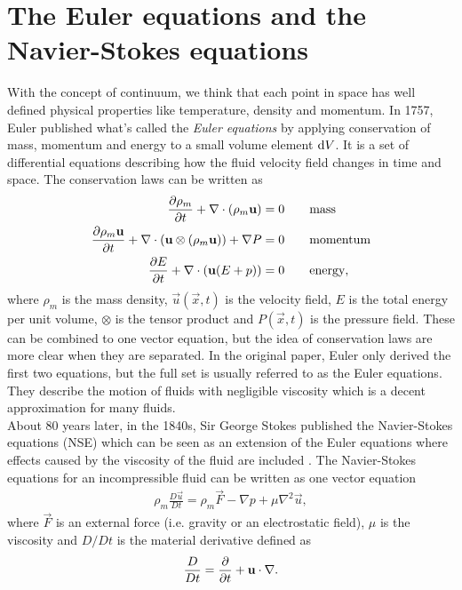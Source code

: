 \section{The Euler equations and the Navier-Stokes equations}
\label{sec:theory_of_fluids_euler_navier}
With the concept of continuum, we think that each point in space has well defined physical properties like temperature, density and momentum. In 1757, Euler published what's called the \textit{Euler equations} by applying conservation of mass, momentum and energy to a small volume element $\mathrm{d}V$. It is a set of differential equations describing how the fluid velocity field changes in time and space. The conservation laws can be written as
\begin{align}
	\frac{\partial \rho_m}{\partial t} + \nabla\cdot (\rho_m\mathbf u) &= 0 \qquad \text{mass}\\
	\frac{\partial \rho_m \mathbf u}{\partial t} + \nabla \cdot (\mathbf u \otimes (\rho_m\mathbf u)) + \nabla P &= 0\qquad \text{momentum}\\
	\frac{\partial E}{\partial t} + \nabla\cdot (\mathbf u(E + p)) &= 0\qquad \text{energy},
\end{align}
where $\rho_m$ is the mass density, $\vec u(\vec x, t)$ is the velocity field, $E$ is the total energy per unit volume, $\otimes$ is the tensor product and $P(\vec x, t)$ is the pressure field. These can be combined to one vector equation, but the idea of conservation laws are more clear when they are separated. In the original paper, Euler only derived the first two equations, but the full set is usually referred to as the Euler equations. They describe the motion of fluids with negligible viscosity which is a decent approximation for many fluids.\\
About 80 years later, in the 1840s, Sir George Stokes published the Navier-Stokes equations (NSE) which can be seen as an extension of the Euler equations where effects caused by the viscosity of the fluid are included \cite{batchelor2000introduction}. The Navier-Stokes equations for an incompressible fluid can be written as one vector equation
\begin{align}
	\label{eq:nse_incompressible}
	\rho_m \frac{D\vec u}{Dt} = \rho_m \vec F - \nabla p + \mu\nabla^2\vec u,
\end{align}
where $\vec F$ is an external force (i.e. gravity or an electrostatic field), $\mu$ is the viscosity and $D/Dt$ is the material derivative defined as
\begin{align}
	\frac{D}{Dt} = \frac{\partial }{\partial t} + \mathbf u\cdot \nabla.
\end{align}
